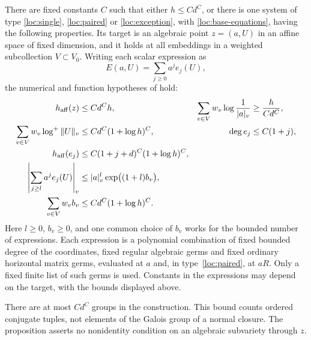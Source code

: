 \begin{proposition}\label{loc:groups}
There are fixed constants $C$ such that either $h\leq Cd^C$, or there
is one system of type \eqref{loc:single}, \eqref{loc:paired} or
\eqref{loc:exception}, with \eqref{loc:base-equations}, having the
following properties.  Its target is an algebraic point $z=(a,U)$
in an affine space of fixed dimension, and it holds at all embeddings
in a weighted subcollection $V\subset V_0$.  Writing each scalar
expression as
\[
 E(a,U)=\sum_{j\geq0}a^j e_j(U),
\]
the numerical and function hypotheses of  hold:
\begin{align}
 h_{\mathrm{aff}}(z)&\leq Cd^C h,
 &\sum_{v\in V}w_v\log\frac1{|a|_v}&\geq\frac{h}{Cd^C},
 \label{loc:group-height-mass}\\
 \sum_{v\in V}w_v\log^+\|U\|_v
   &\leq Cd^C(1+\log h)^C,
 &\deg e_j&\leq C(1+j),
 \label{loc:group-local-degree}\\
 h_{\mathrm{aff}}(e_j)
   &\leq C(1+j+d)^C(1+\log h)^C,
 \label{loc:coefficient-height}\\
 \left|\sum_{j\geq l}a^j e_j(U)\right|_v
   &\leq |a|_v^l\exp\bigl((1+l)b_v\bigr),\notag\\
 \sum_{v\in V}w_v b_v&\leq Cd^C(1+\log h)^C.
 \label{loc:tail-bound}
\end{align}
Here $l\geq0$, $b_v\geq0$, and one common choice of $b_v$ works for
the bounded number of expressions.  Each expression is a polynomial
combination of fixed bounded degree of the coordinates, fixed regular
algebraic germs and fixed ordinary horizontal matrix germs, evaluated
at $a$ and, in type~\eqref{loc:paired}, at $aR$.  Only a fixed finite
list of such germs is used.  Constants in the expressions may depend
on the target, with the bounds displayed above.

There are at most $Cd^C$ groups in the construction.  This bound counts
ordered conjugate tuples, not elements of the Galois group of a normal
closure.  The proposition asserts no nonidentity condition on an
algebraic subvariety through $z$.
\end{proposition}

